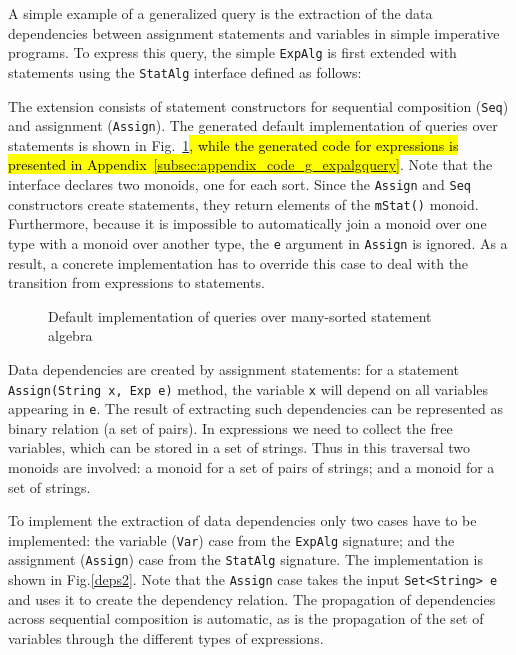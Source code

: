 A simple example of a generalized query is the extraction of the data
dependencies between assignment statements and variables in simple
imperative programs.  To express this query, the simple
\lstinline{ExpAlg} is first extended with statements using the
\lstinline{StatAlg} interface defined as follows:


The extension consists of statement constructors for sequential composition
(\lstinline{Seq}) and assignment (\lstinline{Assign}).  The generated
default implementation of queries over statements is shown in
Fig.~\ref{LST:gstatquery}\hl{, while the generated code for expressions is
presented in Appendix~\ref{subsec:appendix_code_g_expalgquery}}.  Note that the interface declares two
monoids, one for each sort.  Since the \lstinline{Assign} and
\lstinline{Seq} constructors create statements, they return elements
of the \lstinline{mStat()} monoid.  Furthermore, because it is
impossible to automatically join a monoid over one type with a monoid
over another type, the \lstinline{e} argument in \lstinline{Assign}
is ignored.  As a result, a
concrete implementation has to override this case to deal with the
transition from expressions to statements.

\begin{figure}[t]
\nocaptionrule
\caption{Default implementation of queries over many-sorted statement algebra}
\label{LST:gstatquery}
\end{figure}



Data dependencies are created by assignment statements: for a
statement \lstinline{Assign(String x, Exp e)} method, the variable
\lstinline{x} will depend on all variables appearing in \lstinline{e}.
The result of extracting such dependencies can be represented as
binary relation (a set of pairs). In expressions we need to collect
the free variables, which can be stored in a set of strings.  Thus in
this traversal two monoids are involved: a monoid for a set of pairs
of strings; and a monoid for a set of strings.

To implement the extraction of data dependencies only two cases have to
be implemented: the variable (\lstinline{Var}) case from the
\lstinline{ExpAlg} signature; and the assignment (\lstinline{Assign})
case from the \lstinline{StatAlg} signature.  The implementation is
shown in Fig.\ref{deps2}.  Note that the \lstinline{Assign} case takes
the input \lstinline{Set<String> e} and uses it to create the
dependency relation.  The propagation of dependencies across
sequential composition is automatic, as is the propagation of the set
of variables through the different types of expressions.


